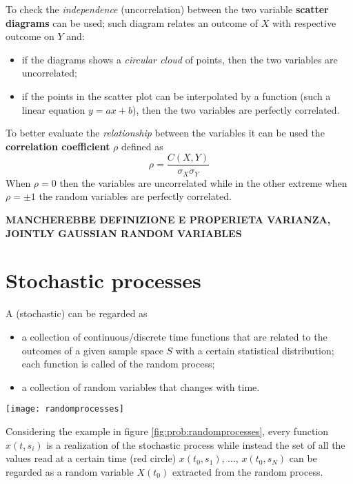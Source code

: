 		To check the \textit{independence} (uncorrelation) between the two variable \textbf{scatter diagrams} can be used; such diagram relates an outcome of $X$ with respective outcome on $Y$ and:
		\begin{itemize}
			\item if the diagrams shows a \textit{circular cloud} of points, then the two variables are uncorrelated;
			\item if the points in the scatter plot can be interpolated by a function (such a linear equation $y = ax +b$), then the two variables are perfectly correlated.
		\end{itemize}
		To better evaluate the \textit{relationship} between the variables it can be used the \textbf{correlation coefficient} $\rho$ defined as
		\begin{equation}
			\rho = \frac{C(X,Y)}{\sigma_X \sigma_Y}
		\end{equation}
		When $\rho = 0$ then the variables are uncorrelated while in the other extreme when $\rho = \pm 1$ the random variables are perfectly correlated.
		
		\vspace{3mm}
		
		\textbf{MANCHEREBBE DEFINIZIONE E PROPERIETA VARIANZA, JOINTLY GAUSSIAN RANDOM VARIABLES}
	
\section{Stochastic processes}
	A  (stochastic)  can be regarded as
	\begin{itemize}
		\item a collection of continuous/discrete time functions that are related to the outcomes of a given sample space $S$ with a certain statistical distribution; each function is called  of the random process;		
		\item a collection of random variables that changes with time.
	\end{itemize}
	
	\begin{SCfigure}[2][bt]
		\centering \texttt{[image: randomprocesses]}
		\caption{scheme to refer while dealing with random processes.} \label{fig:prob:randomprocesses}
	\end{SCfigure} \noindent

	Considering the example in figure \ref{fig:prob:randomprocesses}, every function $x(t,s_i)$ is a realization of the stochastic process while instead the set of all the values read at a certain time (red circle) $x(t_0,s_1)$, $\dots$, $ x(t_0,s_N)$ can be regarded as a random variable $X(t_0)$ extracted from the random process.

